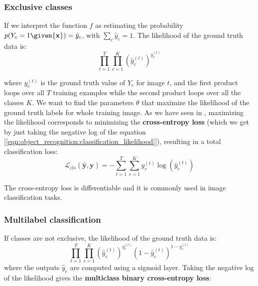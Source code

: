 \subsubsection{Exclusive classes}

If we interpret the function $f$ as estimating the probability $p(Y_c=1 \given {\bf x}) = \hat{y}_c$, with $\sum_c \hat{y}_c =1$. The likelihood of the ground truth data is:
\begin{equation}
\prod_{t=1}^T \prod_{c=1}^K \left( \hat{y}^{(t)}_c \right) ^{y^{(t)}_c}\label{eqn:object_recognition:classification_likelihood}
\end{equation}


where $y^{(t)}_c$ is the ground truth value of $Y_c$ for image $t$, and the first product loops over all $T$ training examples while the second product loops over all the classes $K$. We want to find the parameters $\theta$ that maximize the likelihood of the ground truth labels for whole training image. As we have seen in \chap{\ref{chapter:convolutional_neural_nets}}, maximizing the likelihood corresponds to minimizing the {\bf cross-entropy loss} (which we get by just taking the negative log of the  equation [\ref{eqn:object_recognition:classification_likelihood}]), resulting in a total classification loss:
\begin{equation}
    \mathcal{L}_{cls}(\hat{\mathbf{y}},\mathbf{y})
     = -\sum_{t=1}^{T} \sum_{c=1}^{K} y^{(t)}_c \log(\hat{y}^{(t)}_c)
\end{equation}

The cross-entropy loss is differentiable and it is commonly used in image classification tasks. 

\subsubsection{Multilabel classification}

If classes are not exclusive, the likelihood of the ground truth data is:
\begin{equation}
\prod_{t=1}^T \prod_{c=1}^K \left( \hat{y}^{(t)}_c \right) ^{y^{(t)}_c}
\left( 1-\hat{y}^{(t)}_c \right) ^{1-y^{(t)}_c}
\end{equation}
where the outputs $\hat{y}_c$ are computed using a sigmoid layer. Taking the negative log of the likelihood gives the {\bf multiclass binary cross-entropy loss}:

